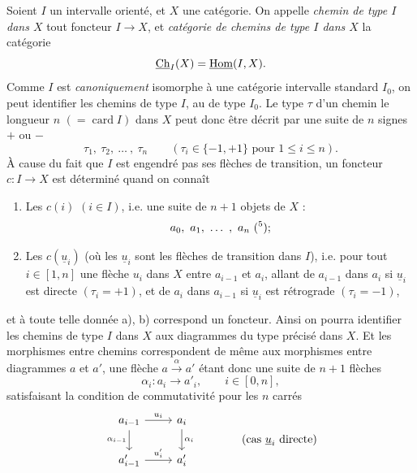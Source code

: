 Soient $I$ un intervalle orienté, et $X$ une catégorie. On appelle \textit{chemin de type $I$ dans $X$} tout foncteur $I \longrightarrow X$, et \textit{catégorie de chemins de type $I$ dans $X$} la catégorie
\[
\underline{\mathrm{Ch}}_I(X) = \underline{\mathrm{Hom}}(I,X).
\]
Comme $I$ est \textit{canoniquement} isomorphe à une catégorie intervalle standard $I_0$, on peut identifier les chemins de type $I$, au de type $I_0$. Le type $\tau$ d'un chemin le longueur $n$ $(= \operatorname{card} I)$ dans $X$ peut donc être décrit par une suite de $n$ signes $+$ ou $-$ %
\[
\tau_1,\ \tau_2,\ \dots\ ,\ \tau_n \qquad (\tau_i \in \{-1,+1\} \text{ pour } 1 \leq i \leq n).
\]
À cause du fait que $I$ est engendré pas ses flèches de transition, un foncteur $c : I \longrightarrow X$ est déterminé quand on connaît %

\begin{enumerate}
\item[a)] Les $c(i)$ $(i \in I)$, i.e. une suite de $n+1$ objets de $X$ :
\[
a_0,\ a_1,\ \dots\ ,\ a_n\ (\text{\footnotemark[5]});
\]

\item[b)] Les $c(\underline{u}_i)$ (où les $\underline{u}_i$ sont les flèches de transition dans $I$), i.e. pour tout $i \in [1,n]$ une flèche $u_i$ dans $X$ entre $a_{i-1}$ et $a_i$, allant de $a_{i-1}$ dans $a_i$ si $\underline{u}_i$ est directe $(\tau_i = +1)$, et de $a_i$ dans $a_{i-1}$ si $\underline{u}_i$ est rétrograde $(\tau_i = -1)$,
\end{enumerate}

et à toute telle donnée a), b) correspond un foncteur. Ainsi on pourra identifier les chemins de type $I$  dans $X$ aux diagrammes du type précisé dans $X$. Et les morphismes entre chemins correspondent de même aux morphismes entre diagrammes $a$ et $a'$, une flèche $a \xrightarrow{\alpha} a'$ étant donc une suite de $n+1$ flèches
\[
\alpha_i : a_i \longrightarrow a'_i, \qquad i \in [0,n],
\]
satisfaisant la condition de commutativité pour les $n$ carrés
\[
\begin{tikzcd}
a_{i-1} \arrow[r, "u_i"] \arrow[d, "\alpha_{i-1}"'] & a_i \arrow[d, "\alpha_i"] \\
a'_{i-1} \arrow[r, "u'_i"] & a'_i
\end{tikzcd}
\qquad\qquad \text{(cas $\underline{u}_i$ directe)}
\]

